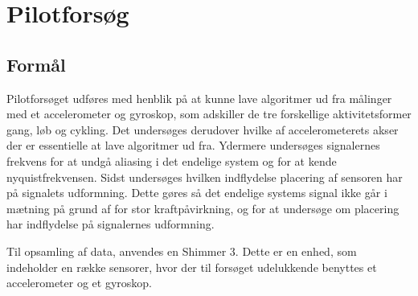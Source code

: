 \chapter{Pilotforsøg}\vspace{-.75cm}\label{pilot}
\section{Formål}
Pilotforsøget udføres med henblik på at kunne lave algoritmer ud fra målinger med et accelerometer og gyroskop, som adskiller de tre forskellige aktivitetsformer gang, løb og cykling. Det undersøges derudover hvilke af accelerometerets akser der er essentielle at lave algoritmer ud fra. Ydermere undersøges signalernes frekvens for at undgå aliasing i det endelige system og for at kende nyquistfrekvensen. Sidst undersøges hvilken indflydelse placering af sensoren har på signalets udformning. Dette gøres så det endelige systems signal ikke går i mætning på grund af for stor kraftpåvirkning, og for at undersøge om placering har indflydelse på signalernes udformning.

Til opsamling af data, anvendes en Shimmer 3. Dette er en enhed, som indeholder en række sensorer, hvor der til forsøget udelukkende benyttes et accelerometer og et gyroskop. 

